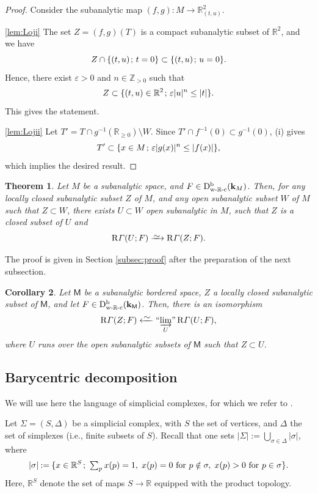\documentclass[11pt]{article}
\numberwithin{equation}{section}
\newcommand{\isom}{\xrightarrow{{\raisebox{-.6ex}[0ex][0ex]{$\mspace{1mu}\textstyle\sim\mspace{2mu}$}}}}
\newcommand{\isofrom}[1][]{\xleftarrow[#1]%
{\raisebox{-.4ex}[0ex][-.4ex]{$\mspace{2mu}\sim\mspace{2mu}$}}}
\newcommand{\semicolon}{\nobreak \mskip2mu\mathpunct{}\nonscript\mkern-\thinmuskip{;}\mskip6mu plus1mu\relax}
\theoremstyle{plain}
\newtheorem{theorem}{Theorem}[section]
\newtheorem{corollary}[theorem]{Corollary}
\theoremstyle{definition}
\newcommand{\R}{\mathbb{R}}
\newcommand{\Z}{\mathbb{Z}}
\newcommand{\derived}[1]{\mathrm{#1}}
\newcommand{\derd}{\derived{D}}
\newcommand{\derr}{\derived{R}}
\newcommand{\BDC}{\derd^{\mathrm{b}}}
\newcommand{\wRc}{{\mathrm{w}\text-\R\text-\mathrm{c}}}
\newcommand{\field}{\mathbf{k}}\let\cor\field
\newcommand{\rsect}{\derr\varGamma}
\newcommand{\bbM}{\mathsf{M}}
\newcommand{\defeq}{\mathbin{:=}}\let \seteq\defeq
\newcommand{\indlim}[1][]{\mathop{\text{\rm``$\varinjlim$''}}\limits_{#1}}
\newcommand{\st}[1]{{\{{#1}\}}}
\newcommand{\opb}[1]{#1^{-1}}
\begin{document}
\begin{proof}
Consider the subanalytic map $(f,g)\colon M\to\R^2_{(t,u)}$.

\eqref{lem:Loji}
The set $Z=(f,g)(T)$ is a compact subanalytic subset of $\R^2$, and we have
\[
Z\cap\st{(t,u)\semicolon t=0}\subset\st{(t,u)\semicolon u=0}.
\]
Hence, there exist $\varepsilon>0$ and $n\in\Z_{>0}$ such that
\[
Z \subset \st{(t,u)\in\R^2\semicolon \varepsilon|u|^n\leq |t|}.
\]
This gives the statement.

\eqref{lem:Lojii}
Let $T'=T\cap\opb g(\R_{\geq 0})\setminus W$. Since $T'\cap\opb f(0)\subset\opb g(0)$, (i) gives
\[
T'\subset\st{x\in M\semicolon \varepsilon|g(x)|^n \leq |f(x)|},
\]
which implies the desired result.
\end{proof}

\begin{theorem}\label{th:subanalytic ext}
Let $M$ be a subanalytic space, and $F\in\BDC_{\wRc}(\field_M)$.
Then, for any locally closed subanalytic subset $Z$ of $M$, and any open subanalytic subset $W$ of $M$ such that $Z\subset W$, there exists
$U\subset W$ open subanalytic in $M$, such that
$Z$ is a closed subset of $U$ and
\[
\rsect(U;F)\isom \rsect(Z;F).
\]
\end{theorem}

The proof is given in Section \ref{subsec:proof}
after the preparation of the next subsection.

\begin{corollary}\label{cor:FKU}
Let $\bbM$ be a subanalytic bordered space,
$Z$ a locally closed subanalytic subset of $\bbM$, and let $F\in\BDC_{\wRc}(\field_\bbM)$.
Then, there is an isomorphism
\[
\rsect(Z;F) \isofrom \indlim[U]\rsect(U;F),
\]
where $U$ runs over the open subanalytic subsets of $\bbM$ such that $Z\subset U$.
\end{corollary}

\subsection {Barycentric decomposition}
We will use here the language of simplicial complexes, for which we refer to \cite[\S8.1]{KS90}.

Let $\Sigma=(S,\Delta)$ be a simplicial complex, with $S$ the set of vertices, and $\Delta$ the set of simplexes (i.e., finite subsets of $S$).
Recall that one sets $|\Sigma|\defeq\bigcup\nolimits_{\sigma\in\Delta}|\sigma|$, where
\[
|\sigma|\defeq\st{x\in\R^S\semicolon \textstyle\sum_p x(p)=1,\;x(p)=0\text{ for }p\notin\sigma,\; x(p)>0\text{ for }p\in\sigma }.
\]
Here, $\R^S$ denote the set of maps $S\to\R$ equipped with the product topology.
\end{document}
